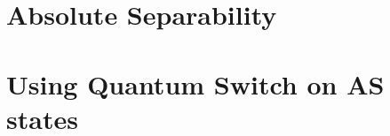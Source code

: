 \documentclass[11pt]{book}
\begin{document}
\chapter{Absolute Separability}
\label{ch:abs}

\chapter{Using Quantum Switch on AS states}
\label{ch:ch5}


%


{}

% 
% 
% 
% 
\end{document}
